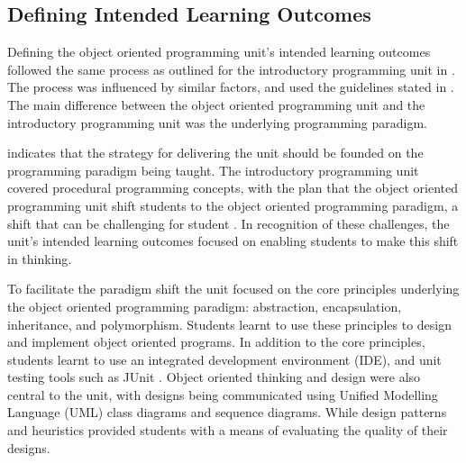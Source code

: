 
\subsection{Defining Intended Learning Outcomes} %
\label{sub:oop_defining_intended_learning_outcomes}

Defining the object oriented programming unit's intended learning outcomes followed the same process as outlined for the introductory programming unit in . The process was influenced by similar factors, and used the guidelines stated in . The main difference between the object oriented programming unit and the introductory programming unit was the underlying programming paradigm. 

 indicates that the strategy for delivering the unit should be founded on the programming paradigm being taught. The introductory programming unit covered procedural programming concepts, with the plan that the object oriented programming unit shift students to the object oriented programming paradigm, a shift that can be challenging for student \cite{Manns:1993,Sheetz:1997,White:2005}. In recognition of these challenges, the unit's intended learning outcomes focused on enabling students to make this shift in thinking.

To facilitate the paradigm shift the unit focused on the core principles underlying the object oriented programming paradigm: abstraction, encapsulation, inheritance, and polymorphism. Students learnt to use these principles to design and implement object oriented programs. In addition to the core principles, students learnt to use an integrated development environment (IDE), and unit testing tools such as JUnit \cite{JUnit}. Object oriented thinking and design were also central to the unit, with designs being communicated using Unified Modelling Language (UML) \cite{OMG:2011} class diagrams and sequence diagrams. While design patterns and heuristics provided students with a means of evaluating the quality of their designs.

